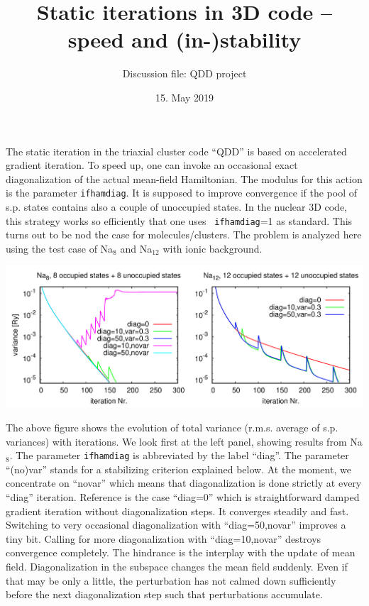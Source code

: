 \documentclass[12pt,a4paper]{article}
\begin{document}
\title{Static iterations in 3D code -- speed and (in-)stability}
\author{Discussion file: QDD project}
\date{15. May 2019}
\maketitle

The static iteration in the triaxial cluster code ``QDD'' is based on
accelerated gradient iteration. To speed up, one can invoke an
occasional exact diagonalization of the actual mean-field Hamiltonian.
The modulus for this action is the parameter {\tt ifhamdiag}. 
It is supposed to improve convergence if the pool of s.p. states
contains also a couple of unoccupied states. 
 In the
nuclear 3D code, this strategy works so efficiently that one uses {\tt
  ifhamdiag}=1 as standard. This turns out to be nod the case for
molecules/clusters. The problem is analyzed here using the test case
of Na$_8$ and Na$_{12}$ with ionic background.

\medskip

\centerline{\includegraphics[width=\linewidth]{test_hamdiag.pdf}}

\medskip

The above figure shows the evolution of total variance (r.m.s. average
of s.p. variances) with iterations. We look first at the left panel,
showing results from Na$_8$.  The parameter {\tt ifhamdiag} is
abbreviated by the label ``diag''. The parameter ``(no)var'' stands
for a stabilizing criterion explained below. At the moment, we
concentrate on ``novar'' which means that diagonalization is done
strictly at every ``diag'' iteration.  Reference is the case
``diag=0'' which is straightforward damped gradient iteration without
diagonalization steps.  It converges steadily and fast. Switching to
very occasional diagonalization with ``diag=50,novar'' improves a tiny
bit. Calling for more diagonalization with ``diag=10,novar'' destroys
convergence completely. The hindrance is the interplay with the update
of mean field. Diagonalization in the subspace changes the mean field
suddenly. Even if that may be only a little, the perturbation has not
calmed down sufficiently before the next diagonalization step such
that perturbations accumulate.
\end{document}
